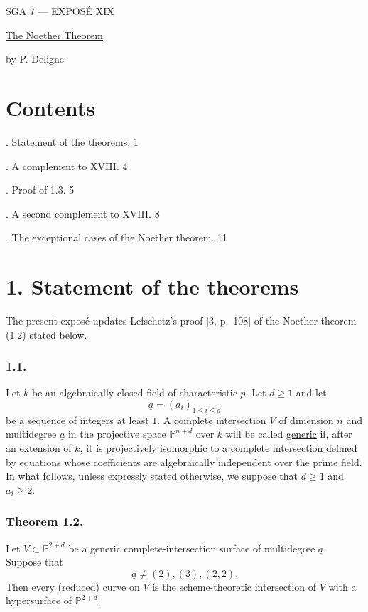 \clearpage
\begin{center}
{\large SGA 7 --- EXPOS\'E XIX}\par
\vspace{2em}
{\Large\underline{The Noether Theorem}}\par
\vspace{1.5em}
{\large by P. Deligne}
\end{center}

\section*{Contents}

. Statement of the theorems. \hfill 1

. A complement to XVIII. \hfill 4

. Proof of 1.3. \hfill 5

. A second complement to XVIII. \hfill 8

. The exceptional cases of the Noether theorem. \hfill 11

\section*{1. Statement of the theorems}

The present expos\'e updates Lefschetz's proof [3, p.~108] of the Noether
theorem (1.2) stated below.

\subsubsection*{1.1.}
Let $k$ be an algebraically closed field of characteristic $p$.  Let
$d\geq1$ and let
\[
\underline a=(a_i)_{1\leq i\leq d}
\]
be a sequence of integers at least $1$.  A complete intersection $V$ of
dimension $n$ and multidegree $\underline a$ in the projective space
$\mathbb P^{n+d}$ over $k$ will be called \underline{generic} if, after an
extension of $k$, it is projectively isomorphic to a complete intersection
defined by equations whose coefficients are algebraically independent over
the prime field.  In what follows, unless expressly stated otherwise, we
suppose that $d\geq1$ and $a_i\geq2$.

\subsubsection*{Theorem 1.2.}
Let $V\subset\mathbb P^{2+d}$ be a generic complete-intersection surface of
multidegree $\underline a$.  Suppose that
\[
\underline a\ne(2),(3),(2,2).
\]
Then every (reduced) curve on $V$ is the scheme-theoretic intersection of
$V$ with a hypersurface of $\mathbb P^{2+d}$.

